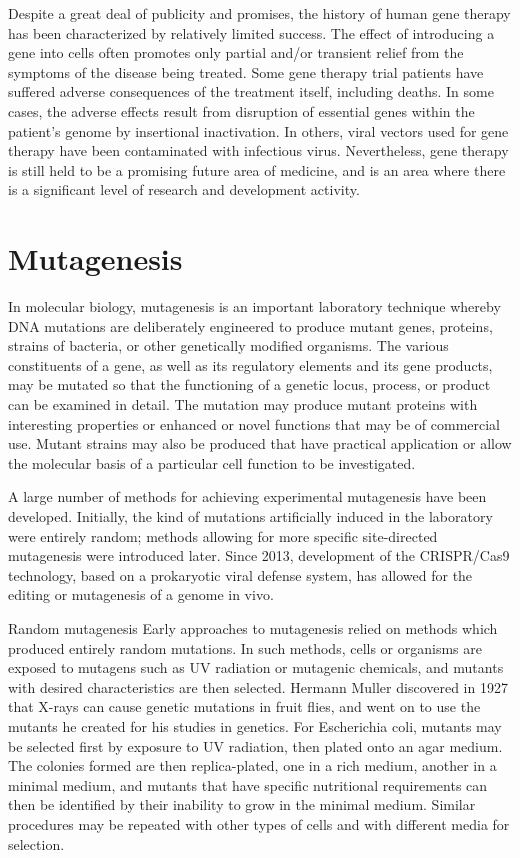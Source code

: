 Despite a great deal of publicity and promises, the history of human gene therapy has been characterized by relatively limited success. The effect of introducing a gene into cells often promotes only partial and/or transient relief from the symptoms of the disease being treated. Some gene therapy trial patients have suffered adverse consequences of the treatment itself, including deaths. In some cases, the adverse effects result from disruption of essential genes within the patient's genome by insertional inactivation. In others, viral vectors used for gene therapy have been contaminated with infectious virus. Nevertheless, gene therapy is still held to be a promising future area of medicine, and is an area where there is a significant level of research and development activity.

\hypertarget{mutagenesis-1}{%
\section{Mutagenesis}\label{mutagenesis-1}}

In molecular biology, mutagenesis is an important laboratory technique whereby DNA mutations are deliberately engineered to produce mutant genes, proteins, strains of bacteria, or other genetically modified organisms. The various constituents of a gene, as well as its regulatory elements and its gene products, may be mutated so that the functioning of a genetic locus, process, or product can be examined in detail. The mutation may produce mutant proteins with interesting properties or enhanced or novel functions that may be of commercial use. Mutant strains may also be produced that have practical application or allow the molecular basis of a particular cell function to be investigated.

A large number of methods for achieving experimental mutagenesis have been developed. Initially, the kind of mutations artificially induced in the laboratory were entirely random; methods allowing for more specific site-directed mutagenesis were introduced later. Since 2013, development of the CRISPR/Cas9 technology, based on a prokaryotic viral defense system, has allowed for the editing or mutagenesis of a genome in vivo.

Random mutagenesis
Early approaches to mutagenesis relied on methods which produced entirely random mutations. In such methods, cells or organisms are exposed to mutagens such as UV radiation or mutagenic chemicals, and mutants with desired characteristics are then selected. Hermann Muller discovered in 1927 that X-rays can cause genetic mutations in fruit flies, and went on to use the mutants he created for his studies in genetics. For Escherichia coli, mutants may be selected first by exposure to UV radiation, then plated onto an agar medium. The colonies formed are then replica-plated, one in a rich medium, another in a minimal medium, and mutants that have specific nutritional requirements can then be identified by their inability to grow in the minimal medium. Similar procedures may be repeated with other types of cells and with different media for selection.

